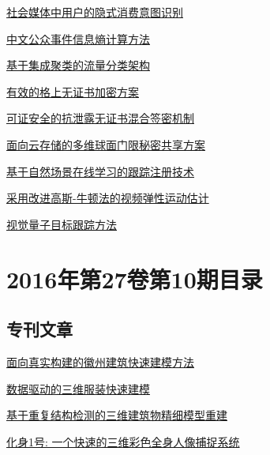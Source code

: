 \documentclass[a4paper]{article}
\begin{document}
\href{http://www.jos.org.cn/ch/reader/create_pdf.aspx?file_no=4870&year_id=2016&quarter_id=11&falg=1}{社会媒体中用户的隐式消费意图识别}

\href{http://www.jos.org.cn/ch/reader/create_pdf.aspx?file_no=4932&year_id=2016&quarter_id=11&falg=1}{中文公众事件信息熵计算方法}

\href{http://www.jos.org.cn/ch/reader/create_pdf.aspx?file_no=4885&year_id=2016&quarter_id=11&falg=1}{基于集成聚类的流量分类架构}

\href{http://www.jos.org.cn/ch/reader/create_pdf.aspx?file_no=4884&year_id=2016&quarter_id=11&falg=1}{有效的格上无证书加密方案}

\href{http://www.jos.org.cn/ch/reader/create_pdf.aspx?file_no=4941&year_id=2016&quarter_id=11&falg=1}{可证安全的抗泄露无证书混合签密机制}

\href{http://www.jos.org.cn/ch/reader/create_pdf.aspx?file_no=4943&year_id=2016&quarter_id=11&falg=1}{面向云存储的多维球面门限秘密共享方案}

\href{http://www.jos.org.cn/ch/reader/create_pdf.aspx?file_no=4865&year_id=2016&quarter_id=11&falg=1}{基于自然场景在线学习的跟踪注册技术}

\href{http://www.jos.org.cn/ch/reader/create_pdf.aspx?file_no=4886&year_id=2016&quarter_id=11&falg=1}{采用改进高斯-牛顿法的视频弹性运动估计}

\href{http://www.jos.org.cn/ch/reader/create_pdf.aspx?file_no=4931&year_id=2016&quarter_id=11&falg=1}{视觉量子目标跟踪方法}


\section{\textbf{2016年第27卷第10期目录}}
\subsection{专刊文章}
\href{http://www.jos.org.cn/ch/reader/download_pdf.aspx?file_no=5070&year_id=2016&quarter_id=10&falg=1}{面向真实构建的徽州建筑快速建模方法}

\href{http://www.jos.org.cn/ch/reader/download_pdf.aspx?file_no=5071&year_id=2016&quarter_id=10&falg=1}{数据驱动的三维服装快速建模}

\href{http://www.jos.org.cn/ch/reader/download_pdf.aspx?file_no=5072&year_id=2016&quarter_id=10&falg=1}{基于重复结构检测的三维建筑物精细模型重建}

\href{http://www.jos.org.cn/ch/reader/download_pdf.aspx?file_no=5073&year_id=2016&quarter_id=10&falg=1}{化身1号: 一个快速的三维彩色全身人像捕捉系统}
\end{document}
